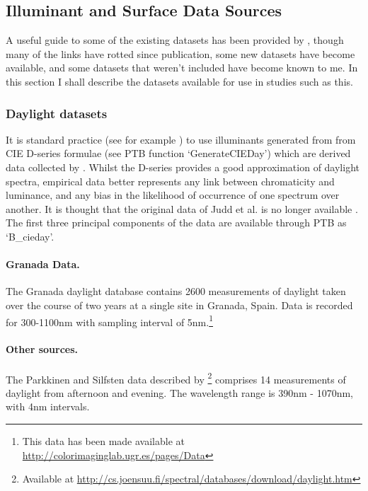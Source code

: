 \subsection{Illuminant and Surface Data Sources}

A useful guide to some of the existing datasets has been provided by \citet{kohonen_databases_2006}, though many of the links have rotted since publication, some new datasets have become available, and some datasets that weren't included have become known to me. In this section I shall describe the datasets available for use in studies such as this.

\subsubsection{Daylight datasets}

It is standard practice (see for example \citet{barrionuevo_contributions_2014}) to use illuminants generated from from CIE D-series formulae (see \gls{PTB} function `GenerateCIEDay') which are derived data collected by \citet{judd_spectral_1964}. Whilst the D-series provides a good approximation of daylight spectra, empirical data better represents any link between chromaticity and luminance, and any bias in the likelihood of occurrence of one spectrum over another. It is thought that the original data of Judd et al. is no longer available \citep[p.~60]{maloney_computational_1984}. The first three principal components of the data are available through \gls{PTB} as `B\_cieday'.

\paragraph{Granada Data.}
The Granada daylight database \citep{hernandez-andres_color_2001} contains 2600 measurements of daylight taken over the course of two years at a single site in Granada, Spain. Data is recorded for 300-1100nm with sampling interval of 5nm.\footnote{This data has been made available at \url{http://colorimaginglab.ugr.es/pages/Data}}

\paragraph{Other sources.}

The Parkkinen and Silfsten data described by \citet{kohonen_databases_2006}\footnote{Available at \url{http://cs.joensuu.fi/spectral/databases/download/daylight.htm}} comprises 14 measurements of daylight from afternoon and evening. The wavelength range is 390nm - 1070nm, with 4nm intervals.

